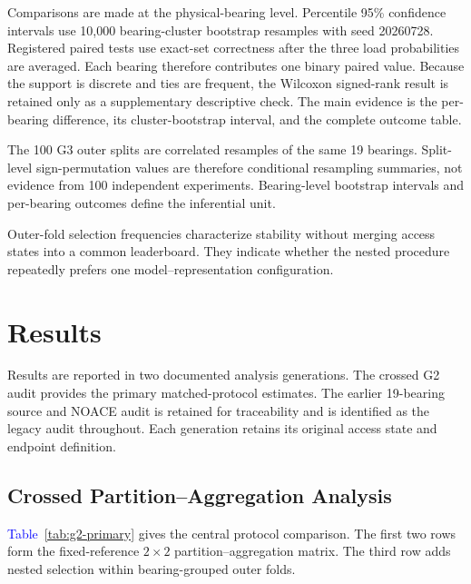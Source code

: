 \documentclass[machines,article,submit,oneauthor,pdftex]{Definitions/mdpi}
\newcommand{\tbl}[1]{\textcolor{blue}{Table~#1}}
\begin{document}
Comparisons are made at the physical-bearing level. Percentile 95\% confidence intervals use 10,000 bearing-cluster bootstrap resamples with seed 20260728. Registered paired tests use exact-set correctness after the three load probabilities are averaged. Each bearing therefore contributes one binary paired value. Because the support is discrete and ties are frequent, the Wilcoxon signed-rank result is retained only as a supplementary descriptive check. The main evidence is the per-bearing difference, its cluster-bootstrap interval, and the complete outcome table.

The 100 G3 outer splits are correlated resamples of the same 19 bearings. Split-level sign-permutation values are therefore conditional resampling summaries, not evidence from 100 independent experiments. Bearing-level bootstrap intervals and per-bearing outcomes define the inferential unit.

Outer-fold selection frequencies characterize stability without merging access states into a common leaderboard. They indicate whether the nested procedure repeatedly prefers one model--representation configuration.

\section{Results}

Results are reported in two documented analysis generations. The crossed G2 audit provides the primary matched-protocol estimates. The earlier 19-bearing source and NOACE audit is retained for traceability and is identified as the legacy audit throughout. Each generation retains its original access state and endpoint definition.

\subsection{Crossed Partition--Aggregation Analysis}

\tbl{\ref{tab:g2-primary}} gives the central protocol comparison. The first two rows form the fixed-reference $2\times2$ partition--aggregation matrix. The third row adds nested selection within bearing-grouped outer folds.
\end{document}
